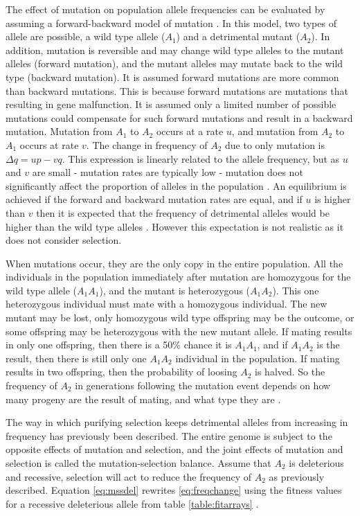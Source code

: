 The effect of mutation on population allele frequencies can be evaluated by assuming a forward-backward model of mutation \parencite{Hedrick2010}.
In this model, two types of allele are possible, a wild type allele ($A_1$) and a detrimental mutant ($A_2$).
In addition, mutation is reversible and may change wild type alleles to the mutant alleles (forward mutation), and the mutant alleles may mutate back to the wild type (backward mutation).
It is assumed forward mutations are more common than backward mutations.
This is because forward mutations are mutations that resulting in gene malfunction. It is assumed only a limited number of possible mutations could compensate for such forward mutations and result in a backward mutation.
Mutation from $A_1$ to $A_2$ occurs at a rate $u$, and mutation from $A_2$ to $A_1$ occurs at rate $v$.
The change in frequency of $A_2$ due to only mutation is $\Delta q = up - vq$.
This expression is linearly related to the allele frequency, but as $u$ and $v$ are small - mutation rates are typically low - mutation does not significantly affect the proportion of alleles in the population \parencite{Hedrick2010}.
An equilibrium is achieved if the forward and backward mutation rates are equal, and if $u$ is higher than $v$ then it is expected that the frequency of detrimental alleles would be higher than the wild type alleles \parencite{Hedrick2010}.
However this expectation is not realistic as it does not consider selection.

When mutations occur, they are the only copy in the entire population.
All the individuals in the population immediately after mutation are homozygous for the wild type allele ($A_1A_1$), and the mutant is heterozygous ($A_1A_2$).
This one heterozygous individual must mate with a homozygous individual.
The new mutant may be lost, only homozygous wild type offspring may be the outcome, or some offspring may be heterozygous with the new mutant allele.
If mating results in only one offspring, then there is a 50\% chance it is $A_1A_1$, and if $A_1A_2$ is the result, then there is still only one $A_1A_2$ individual in the population.
If mating results in two offspring, then the probability of loosing $A_2$ is halved.
So the frequency of $A_2$ in generations following the mutation event depends on how many progeny are the result of mating, and what type they are \parencite{Hedrick2010}.

The way in which purifying selection keeps detrimental alleles from increasing in frequency has previously been described.
The entire genome is subject to the opposite effects of mutation and selection, and the joint effects of mutation and selection is called the mutation-selection balance.
Assume that $A_2$ is deleterious and recessive, selection will act to reduce the frequency of $A_2$ as previously described.
Equation \ref{eq:mssdel} rewrites \ref{eq:freqchange} using the fitness values for a recessive deleterious allele from table \ref{table:fitarrays} \parencite{Hedrick2010}.

